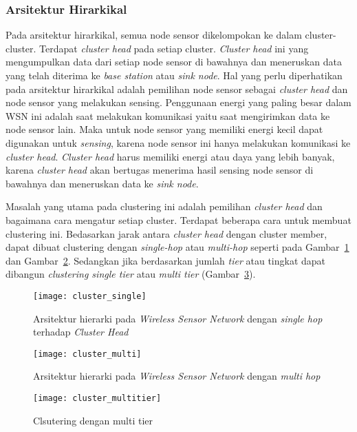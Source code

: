 \subsubsection{Arsitektur Hirarkikal}
Pada arsitektur hirarkikal, semua node sensor dikelompokan ke dalam cluster-cluster. Terdapat \textit{cluster head} pada setiap cluster. \textit{Cluster head} ini yang mengumpulkan data dari setiap node sensor di bawahnya dan meneruskan data yang telah diterima ke \textit{base station} atau \textit{sink node}. Hal yang perlu diperhatikan pada arsitektur hirarkikal adalah pemilihan node sensor sebagai \textit{cluster head} dan node sensor yang melakukan sensing. Penggunaan energi yang paling besar dalam WSN ini adalah saat melakukan komunikasi yaitu saat mengirimkan data ke node sensor lain. Maka untuk node sensor yang memiliki energi kecil dapat digunakan untuk \textit{sensing}, karena node sensor ini hanya melakukan komunikasi ke \textit{cluster head}. \textit{Cluster head} harus memiliki energi atau daya yang lebih banyak, karena \textit{cluster head} akan bertugas menerima hasil sensing node sensor di bawahnya dan meneruskan data ke \textit{sink node}. 

Masalah yang utama pada clustering ini adalah pemilihan \textit{cluster head} dan bagaimana cara mengatur setiap cluster. Terdapat beberapa cara untuk membuat clustering ini. Bedasarkan jarak antara \textit{cluster head} dengan cluster member, dapat dibuat clustering dengan \textit{single-hop} atau \textit{multi-hop} seperti pada Gambar~\ref{fig:cluster_single} dan Gambar~\ref{fig:cluster_multi}. Sedangkan jika berdasarkan jumlah \textit{tier} atau tingkat dapat dibangun \textit{clustering single tier} atau \textit{multi tier} (Gambar~\ref{fig:cluster_multitier}).
\begin{figure} [H]
	\centering  
	\texttt{[image: cluster\_single]}  
	\caption[Arsitektur hierarki pada \textit{Wireless Sensor Network} dengan \textit{single hop} terhadap \textit{Cluster Head}]{Arsitektur hierarki pada \textit{Wireless Sensor Network} dengan \textit{single hop} terhadap \textit{Cluster Head}} 
	\label{fig:cluster_single} 
\end{figure} 
\begin{figure} [H]
	\centering  
	\texttt{[image: cluster\_multi]}  
	\caption[Arsitektur hierarki pada \textit{Wireless Sensor Network} dengan \textit{multi hop}]{Arsitektur hierarki pada \textit{Wireless Sensor Network} dengan \textit{multi hop}} 
	\label{fig:cluster_multi} 
\end{figure} 
\begin{figure} [H]
	\centering  
	\texttt{[image: cluster\_multitier]}  
	\caption[Clsutering dengan multi tier]{Clsutering dengan multi tier} 
	\label{fig:cluster_multitier} 
\end{figure}

